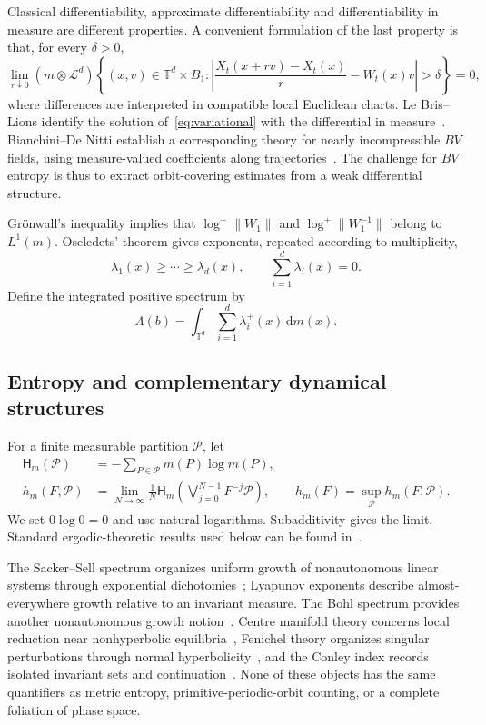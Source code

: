 \documentclass[review,12pt,times,a4paper,nopreprintline]{elsarticle}
\theoremstyle{plain}
\theoremstyle{definition}
\theoremstyle{remark}
\newcommand{\T}{\mathbb T}
\newcommand{\PP}{\mathcal P}
\newcommand{\dd}{\,\mathrm d}
\newcommand{\Ent}{\mathsf H}
\numberwithin{equation}{section}
\begin{document}
Classical differentiability, approximate differentiability and differentiability in measure are different properties. A convenient formulation of the last property is that, for every $\delta>0$,
\begin{equation}\label{eq:differentialmeasure}
 \lim_{r\downarrow0}(m\otimes\mathcal L^d)
 \left\{(x,v)\in\T^d\times B_1:
 \left|\frac{X_t(x+rv)-X_t(x)}r-W_t(x)v\right|>\delta\right\}=0,
\end{equation}
where differences are interpreted in compatible local Euclidean charts. Le Bris--Lions identify the solution of~\eqref{eq:variational} with the differential in measure~\cite{LeBrisLions}. Bianchini--De Nitti establish a corresponding theory for nearly incompressible $BV$ fields, using measure-valued coefficients along trajectories~\cite{BianchiniDeNitti}. The challenge for $BV$ entropy is thus to extract orbit-covering estimates from a weak differential structure.

Gr\"onwall's inequality implies that $\log^+\|W_1\|$ and $\log^+\|W_1^{-1}\|$ belong to $L^1(m)$. Oseledets' theorem gives exponents, repeated according to multiplicity,
\[
 \lambda_1(x)\geq\cdots\geq\lambda_d(x),\qquad
 \sum_{i=1}^d\lambda_i(x)=0.
\]
Define the integrated positive spectrum by
\begin{equation}\label{eq:lambda}
 \Lambda(b)=\int_{\T^d}\sum_{i=1}^d\lambda_i^+(x)\dd m(x).
\end{equation}

\subsection{Entropy and complementary dynamical structures}
For a finite measurable partition $\PP$, let
\begin{align}
 \Ent_m(\PP)&=-\sum_{P\in\PP}m(P)\log m(P),\label{eq:shannon}\\
 h_m(F,\PP)&=\lim_{N\to\infty}\frac1N
 \Ent_m\!\left(\bigvee_{j=0}^{N-1}F^{-j}\PP\right),\qquad
 h_m(F)=\sup_{\PP}h_m(F,\PP).\label{eq:metricentropy}
\end{align}
We set $0\log0=0$ and use natural logarithms. Subadditivity gives the limit. Standard ergodic-theoretic results used below can be found in~\cite{Walters,KatokHasselblatt}.

The Sacker--Sell spectrum organizes uniform growth of nonautonomous linear systems through exponential dichotomies~\cite{SackerSell}; Lyapunov exponents describe almost-everywhere growth relative to an invariant measure. The Bohl spectrum provides another nonautonomous growth notion~\cite{DoanPalmerRasmussen}. Centre manifold theory concerns local reduction near nonhyperbolic equilibria~\cite{Carr}, Fenichel theory organizes singular perturbations through normal hyperbolicity~\cite{Fenichel}, and the Conley index records isolated invariant sets and continuation~\cite{Conley}. None of these objects has the same quantifiers as metric entropy, primitive-periodic-orbit counting, or a complete foliation of phase space.
\end{document}
